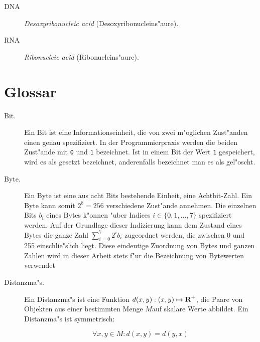 \begin{description}
\item[DNA] \textsl{Desoxyribonucleic acid} (Desoxyribonucleins"aure).
\item[RNA] \textsl{Ribonucleic acid} (Ribonucleins"aure).
\end{description}


\section{Glossar}
\label{glossary}

\begin{description}


\item[Bit.] Ein Bit ist eine Informationseinheit, die von zwei m"oglichen
Zust"anden einen genau spezifiziert. In der Programmierpraxis werden
die beiden Zust"ande mit \verb|0| und \verb|1| bezeichnet.
Ist in einem Bit der Wert \verb|1| gespeichert, wird es als gesetzt
bezeichnet, anderenfalls bezeichnet man es als gel"oscht.

\item[Byte.] Ein Byte ist eine aus acht Bits bestehende Einheit, eine
Achtbit-Zahl. Ein Byte kann somit $2^8=256$ verschiedene Zust"ande
annehmen. Die einzelnen Bits $b_i$ eines Bytes k"onnen "uber Indices $i \in \{0, 1, \ldots, 7\}$
spezifiziert werden. Auf der Grundlage dieser Indizierung kann dem Zustand eines
Bytes die ganze Zahl $\sum_{i=0}^7 2^i b_i$ zugeordnet werden, die zwischen 0
und 255 einschlie"slich liegt. Diese eindeutige Zuordnung von Bytes und
ganzen Zahlen wird in dieser Arbeit stets f"ur die Bezeichnung von
Bytewerten verwendet

\item[Distanzma"s.] Ein Distanzma"s ist eine Funktion $d(x, y): (x, y) \mapsto 
\mbox{\bfseries R}^+$, die Paare von Objekten aus einer bestimmten Menge $M$auf skalare
Werte abbildet. Ein Distanzma"s ist symmetrisch:

\begin{displaymath}
\forall x, y \in M :  d(x, y) = d(y, x)
\end{displaymath}


\end{description}
